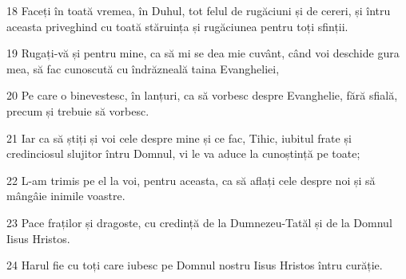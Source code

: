 \par 18 Faceți în toată vremea, în Duhul, tot felul de rugăciuni și de cereri, și întru aceasta priveghind cu toată stăruința și rugăciunea pentru toți sfinții.
\par 19 Rugați-vă și pentru mine, ca să mi se dea mie cuvânt, când voi deschide gura mea, să fac cunoscută cu îndrăzneală taina Evangheliei,
\par 20 Pe care o binevestesc, în lanțuri, ca să vorbesc despre Evanghelie, fără sfială, precum și trebuie să vorbesc.
\par 21 Iar ca să știți și voi cele despre mine și ce fac, Tihic, iubitul frate și credinciosul slujitor întru Domnul, vi le va aduce la cunoștință pe toate;
\par 22 L-am trimis pe el la voi, pentru aceasta, ca să aflați cele despre noi și să mângâie inimile voastre.
\par 23 Pace fraților și dragoste, cu credință de la Dumnezeu-Tatăl și de la Domnul Iisus Hristos.
\par 24 Harul fie cu toți care iubesc pe Domnul nostru Iisus Hristos întru curăție.


